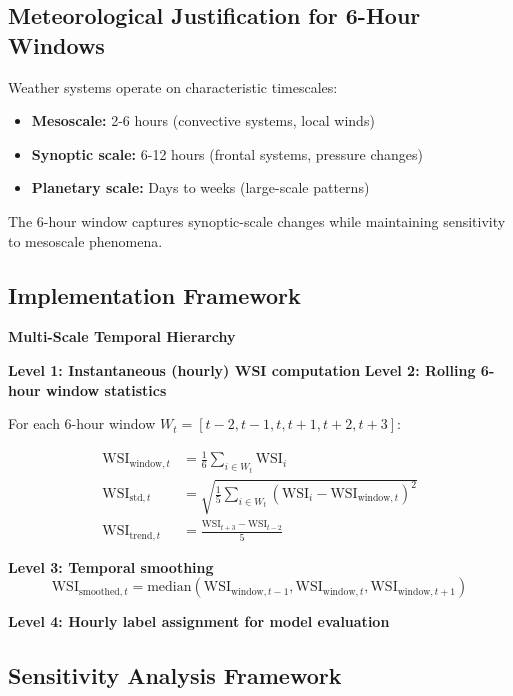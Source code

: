 \documentclass[11pt,a4paper]{article}
\begin{document}
\subsection{Meteorological Justification for 6-Hour Windows}

Weather systems operate on characteristic timescales:
\begin{itemize}
    \item \textbf{Mesoscale:} 2-6 hours (convective systems, local winds)
    \item \textbf{Synoptic scale:} 6-12 hours (frontal systems, pressure changes)
    \item \textbf{Planetary scale:} Days to weeks (large-scale patterns)
\end{itemize}

The 6-hour window captures synoptic-scale changes while maintaining sensitivity to mesoscale phenomena.

\subsection{Implementation Framework}

\begin{mathbox}
\textbf{Multi-Scale Temporal Hierarchy}

\textbf{Level 1: Instantaneous (hourly) WSI computation}
\textbf{Level 2: Rolling 6-hour window statistics}

For each 6-hour window $W_t = [t-2, t-1, t, t+1, t+2, t+3]$:

\begin{align}
\text{WSI}_{\text{window},t} &= \frac{1}{6} \sum_{i \in W_t} \text{WSI}_i \\
\text{WSI}_{\text{std},t} &= \sqrt{\frac{1}{5} \sum_{i \in W_t} (\text{WSI}_i - \text{WSI}_{\text{window},t})^2} \\
\text{WSI}_{\text{trend},t} &= \frac{\text{WSI}_{t+3} - \text{WSI}_{t-2}}{5}
\end{align}

\textbf{Level 3: Temporal smoothing}
$$\text{WSI}_{\text{smoothed},t} = \text{median}(\text{WSI}_{\text{window},t-1}, \text{WSI}_{\text{window},t}, \text{WSI}_{\text{window},t+1})$$

\textbf{Level 4: Hourly label assignment for model evaluation}
\end{mathbox}

\subsection{Sensitivity Analysis Framework}
\end{document}
